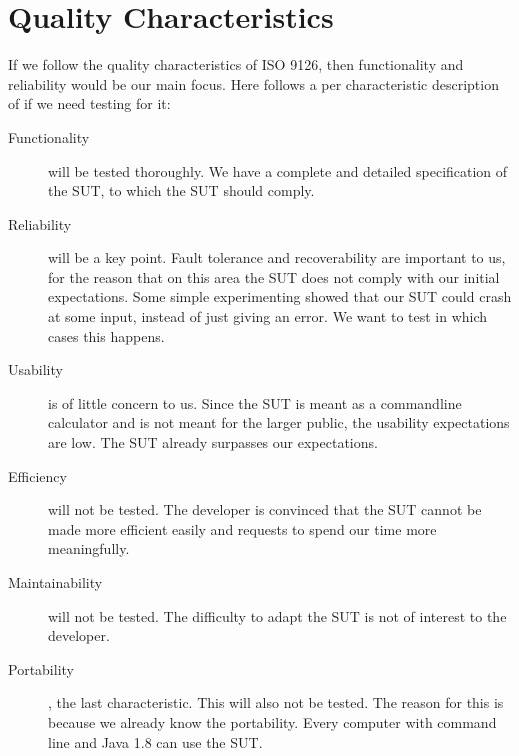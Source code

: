 \documentclass[11pt,a4paper]{article}
\begin{document}

\section{Quality Characteristics}


If we follow the quality characteristics of ISO 9126, then functionality and reliability would be our main focus. Here follows a per characteristic description of if we need testing for it:
\begin{description}
	\item[Functionality] will be tested thoroughly. We have a complete and detailed specification of the SUT, to which the SUT should comply.
	\item[Reliability] will be a key point. Fault tolerance and recoverability are important to us, for the reason that on this area the SUT does not comply with our initial expectations. Some simple experimenting showed that our SUT could crash at some input, instead of just giving an error. We want to test in which cases this happens.
	\item[Usability] is of little concern to us. Since the SUT is meant as a commandline calculator and is not meant for the larger public, the usability expectations are low. The SUT already surpasses our expectations.
	\item[Efficiency] will not be tested. The developer is convinced that the SUT cannot be made more efficient easily and requests to spend our time more meaningfully. %
	\item[Maintainability] will not be tested. The difficulty to adapt the SUT is not of interest to the developer. %
	\item[Portability], the last characteristic. This will also not be tested. The reason for this is because we already know the portability. Every computer with command line and Java 1.8 can use the SUT.
\end{description}
\end{document}
